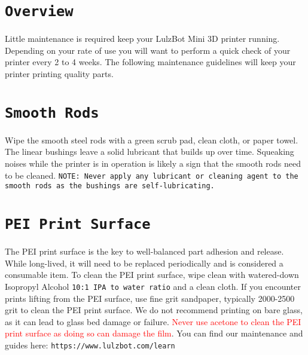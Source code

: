 %
%
%
%
%

\section{\texttt{Overview}}
Little maintenance is required keep your LulzBot\textsuperscript{\miniscule{\textregistered}} Mini 3D printer running. Depending on your rate of use you will want to perform a quick check of your printer every 2 to 4 weeks. The following maintenance guidelines will keep your printer printing quality parts.

\section{\texttt{Smooth Rods}}
Wipe the smooth steel rods with a green scrub pad, clean cloth, or paper towel. The linear bushings leave a solid lubricant that builds up over time. Squeaking noises while the printer is in operation is likely a sign that the smooth rods need to be cleaned. \texttt{NOTE: Never apply any lubricant or cleaning agent to the smooth rods as the bushings are self-lubricating.}


\section{\texttt{PEI Print Surface}}
The PEI print surface is the key to well-balanced part adhesion and release. While long-lived, it will need to be replaced periodically and is considered a consumable item. To clean the PEI print surface, wipe clean with watered-down Isopropyl Alcohol \texttt{10:1 IPA to water ratio} and a clean cloth. If you encounter prints lifting from the PEI surface, use fine grit sandpaper, typically 2000-2500 grit to clean the PEI print surface. We do not recommend printing on bare glass, as it can lead to glass bed damage or failure. \textcolor{red}{Never use acetone to clean the PEI print surface as doing so can damage the film}. You can find our maintenance and guides here:
\texttt{https://www.lulzbot.com/learn}

